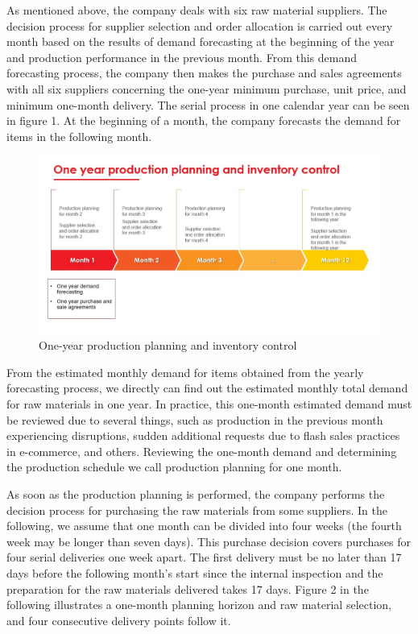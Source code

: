 \documentclass[preprint, 3p,
authoryear]{elsarticle} %
\begin{document}
As mentioned above, the company deals with six raw material suppliers.
The decision process for supplier selection and order allocation is
carried out every month based on the results of demand forecasting at
the beginning of the year and production performance in the previous
month. From this demand forecasting process, the company then makes the
purchase and sales agreements with all six suppliers concerning the
one-year minimum purchase, unit price, and minimum one-month delivery.
The serial process in one calendar year can be seen in figure 1. At the
beginning of a month, the company forecasts the demand for items in the
following month.

\begin{figure}

{\centering \includegraphics[width=0.8\linewidth]{production planning and inventory control} 

}

\caption{One-year production planning and inventory control}\label{fig:unnamed-chunk-1}
\end{figure}

From the estimated monthly demand for items obtained from the yearly
forecasting process, we directly can find out the estimated monthly
total demand for raw materials in one year. In practice, this one-month
estimated demand must be reviewed due to several things, such as
production in the previous month experiencing disruptions, sudden
additional requests due to flash sales practices in e-commerce, and
others. Reviewing the one-month demand and determining the production
schedule we call production planning for one month.

As soon as the production planning is performed, the company performs
the decision process for purchasing the raw materials from some
suppliers. In the following, we assume that one month can be divided
into four weeks (the fourth week may be longer than seven days). This
purchase decision covers purchases for four serial deliveries one week
apart. The first delivery must be no later than 17 days before the
following month's start since the internal inspection and the
preparation for the raw materials delivered takes 17 days. Figure 2 in
the following illustrates a one-month planning horizon and raw material
selection, and four consecutive delivery points follow it.
\end{document}
